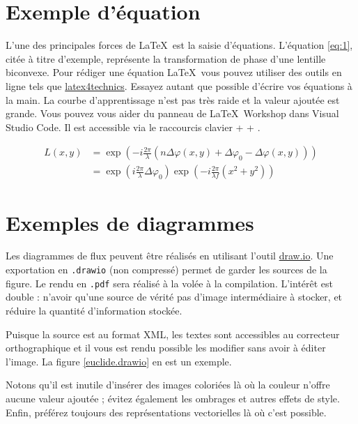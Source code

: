 \section{Exemple d'équation}
L'une des principales forces de \LaTeX~est la saisie d'équations. L'équation \ref{eq:1}, citée à titre d'exemple, représente la transformation de phase d'une lentille biconvexe. Pour rédiger une équation \LaTeX~vous pouvez utiliser des outils en ligne tels que \href{https://www.latex4technics.com/}{latex4technics}. Essayez autant que possible d'écrire vos équations à la main. La courbe d'apprentissage n'est pas très raide et la valeur ajoutée est grande. Vous pouvez vous aider du panneau de \LaTeX~Workshop dans Visual Studio Code. Il est accessible via le raccourcis clavier  +  + .

\begin{equation} \label{eq:1}
    \begin{split}
        L(x,y) &= \exp\left( - i\frac{{2\pi }}{\lambda }\left( {n\Delta \varphi (x,y) + \Delta {\varphi _0} - \Delta \varphi (x,y)} \right)\right)\\
        &= {\exp\left({i\frac{{2\pi }}{\lambda }\Delta {\varphi _0}}\right)}{\exp\left({ - i\frac{{2\pi }}{{\lambda f}}({x^2} + {y^2})}\right)}
    \end{split}
\end{equation}

\section{Exemples de diagrammes}

Les diagrammes de flux peuvent être réalisés en utilisant l'outil \href{https://app.diagrams.net/}{draw.io}. Une exportation en \texttt{.drawio} (non compressé) permet de garder les sources de la figure. Le rendu en \texttt{.pdf} sera réalisé à la volée à la compilation. L'intérêt est double : n'avoir qu'une source de vérité \cad pas d'image intermédiaire à stocker, et réduire la quantité d'information stockée.

Puisque la source est au format XML, les textes sont accessibles au correcteur orthographique et il vous est rendu possible les modifier sans avoir à éditer l'image. La figure \ref{euclide.drawio} en est un exemple.


Notons qu'il est inutile d'insérer des images coloriées là où la couleur n'offre aucune valeur ajoutée ; évitez également les ombrages et autres effets de style. Enfin, préférez toujours des représentations vectorielles là où c'est possible.

